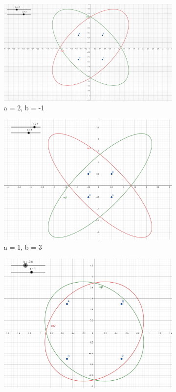 \documentclass[]{article}
\begin{document}
\begin{figure}[!ht]
  \centering
  \begin{subfigure}[b]{0.3\linewidth}
    \includegraphics[width=\linewidth]{image/square_illustrator_1.png}
    \caption{a = 2, b = -1}
  \end{subfigure}
  \begin{subfigure}[b]{0.3\linewidth}
    \includegraphics[width=\linewidth]{image/square_illustrator_2.png}
    \caption{a = 1, b = 3}
  \end{subfigure}
  \begin{subfigure}[b]{0.3\linewidth}
    \includegraphics[width=\linewidth]{image/square_illustrator_3.png}

\end{subfigure}
\end{figure}
\end{document}
